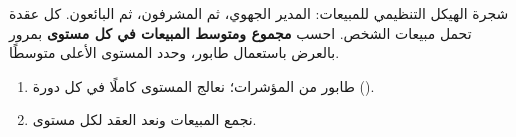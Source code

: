 \begin{statement}
شجرة الهيكل التنظيمي للمبيعات: المدير الجهوي، ثم المشرفون، ثم البائعون. كل عقدة تحمل مبيعات الشخص. احسب \textbf{مجموع ومتوسط المبيعات في كل مستوى} بمرور بالعرض باستعمال طابور، وحدد المستوى الأعلى متوسطًا.
\end{statement}
\begin{stepsbox}\begin{enumerate}
\item طابور من المؤشرات؛ نعالج المستوى كاملًا في كل دورة ().
\item نجمع المبيعات ونعد العقد لكل مستوى.
\end{enumerate}\end{stepsbox}

